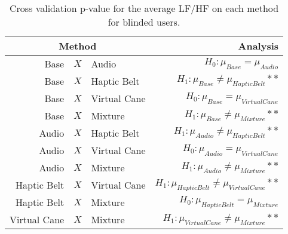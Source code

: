 
\begin{table}[!htb]
\centering
\caption{Cross validation p-value for the average LF/HF on each method for blinded users.}
\label{tab:lsd_lfhf}
\begin{tabular}{rclr}
\toprule
      \multicolumn{3}{c}{Method} &                                           Analysis \\
\midrule
              Base & $X$ & Audio &                   $H_0 : \mu_{Base} = \mu_{Audio}$ \\
        Base & $X$ & Haptic Belt &         $H_1 : \mu_{Base} \ne \mu_{Haptic Belt}**$ \\
       Base & $X$ & Virtual Cane &            $H_0 : \mu_{Base} = \mu_{Virtual Cane}$ \\
            Base & $X$ & Mixture &             $H_1 : \mu_{Base} \ne \mu_{Mixture}**$ \\
       Audio & $X$ & Haptic Belt &        $H_1 : \mu_{Audio} \ne \mu_{Haptic Belt}**$ \\
      Audio & $X$ & Virtual Cane &           $H_0 : \mu_{Audio} = \mu_{Virtual Cane}$ \\
           Audio & $X$ & Mixture &            $H_1 : \mu_{Audio} \ne \mu_{Mixture}**$ \\
Haptic Belt & $X$ & Virtual Cane & $H_1 : \mu_{Haptic Belt} \ne \mu_{Virtual Cane}**$ \\
     Haptic Belt & $X$ & Mixture &          $H_0 : \mu_{Haptic Belt} = \mu_{Mixture}$ \\
    Virtual Cane & $X$ & Mixture &     $H_1 : \mu_{Virtual Cane} \ne \mu_{Mixture}**$ \\
\bottomrule
\end{tabular}
\end{table}

